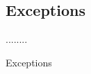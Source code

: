 \documentclass[12pt]{article}
\begin{document}
\subsection{Exceptions} %

........

Exceptions






\end{document}
